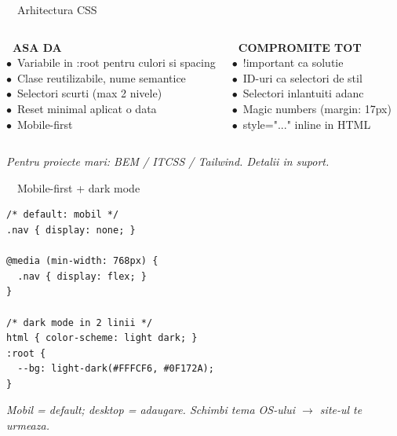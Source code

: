 \documentclass[aspectratio=169,11pt]{beamer}
\newcommand{\code}[1]{{\ttfamily\small\color{accent!85!black}#1}}
\begin{document}
\begin{frame}{\textcolor{themeCss}{\faPaintBrush}\ \ Arhitectura CSS}
\vspace{16pt}
\begin{columns}[T,onlytextwidth]
  {\bfseries\color{daFg}\faCheckCircle\ ASA DA}\\[6pt]
  {\footnotesize
  $\bullet$\ Variabile in \code{:root} pentru culori si spacing\\[4pt]
  $\bullet$\ Clase reutilizabile, nume semantice\\[4pt]
  $\bullet$\ Selectori scurti (max 2 nivele)\\[4pt]
  $\bullet$\ Reset minimal aplicat o data\\[4pt]
  $\bullet$\ Mobile-first
  }

  {\bfseries\color{nuFg}\faTimesCircle\ COMPROMITE TOT}\\[6pt]
  {\footnotesize
  $\bullet$\ \code{!important} ca solutie\\[4pt]
  $\bullet$\ ID-uri ca selectori de stil\\[4pt]
  $\bullet$\ Selectori inlantuiti adanc\\[4pt]
  $\bullet$\ Magic numbers (\code{margin: 17px})\\[4pt]
  $\bullet$\ \code{style="..."} inline in HTML
  }
\end{columns}

\vspace{14pt}
{\footnotesize\color{textDim}\itshape Pentru proiecte mari: BEM / ITCSS / Tailwind. Detalii in suport.}
\end{frame}

\begin{frame}[fragile]{\textcolor{themeCss}{\faPaintBrush}\ \ Mobile-first + dark mode}
\vspace{6pt}
\begin{lstlisting}[style=css]
/* default: mobil */
.nav { display: none; }

@media (min-width: 768px) {
  .nav { display: flex; }
}

/* dark mode in 2 linii */
html { color-scheme: light dark; }
:root {
  --bg: light-dark(#FFFCF6, #0F172A);
}
\end{lstlisting}
\vspace{4pt}
{\footnotesize\color{textDim}\itshape Mobil = default; desktop = adaugare. Schimbi tema OS-ului $\to$ site-ul te urmeaza.}
\end{frame}
\end{document}
